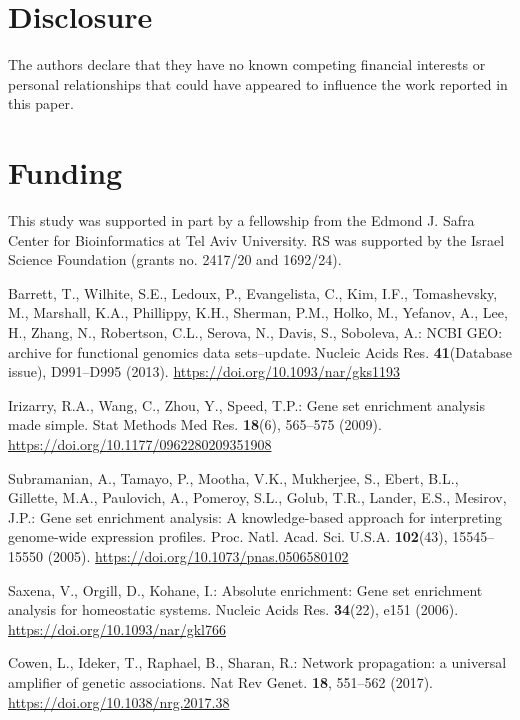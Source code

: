 \documentclass{article}
\begin{document}
\section*{Disclosure}
The authors declare that they have no known competing financial interests or personal relationships that could have appeared to influence the work reported in this paper.

\section*{Funding}
This study was supported in part by a fellowship from the Edmond J. Safra Center for Bioinformatics at Tel Aviv University. 
RS was supported by the Israel Science Foundation (grants no. 2417/20 and 1692/24).

\begin{thebibliography}{spmpsci}

Barrett, T., Wilhite, S.E., Ledoux, P., Evangelista, C., Kim, I.F., Tomashevsky, M., Marshall, K.A., Phillippy, K.H., Sherman, P.M., Holko, M., Yefanov, A., Lee, H., Zhang, N., Robertson, C.L., Serova, N., Davis, S., Soboleva, A.:
NCBI GEO: archive for functional genomics data sets--update.
Nucleic Acids Res. \textbf{41}(Database issue), D991--D995 (2013).
\url{https://doi.org/10.1093/nar/gks1193}

Irizarry, R.A., Wang, C., Zhou, Y., Speed, T.P.:
Gene set enrichment analysis made simple.
Stat Methods Med Res. \textbf{18}(6), 565--575 (2009).
\url{https://doi.org/10.1177/0962280209351908}

Subramanian, A., Tamayo, P., Mootha, V.K., Mukherjee, S., Ebert, B.L., Gillette, M.A., Paulovich, A., Pomeroy, S.L., Golub, T.R., Lander, E.S., Mesirov, J.P.:
Gene set enrichment analysis: A knowledge-based approach for interpreting genome-wide expression profiles.
Proc. Natl. Acad. Sci. U.S.A. \textbf{102}(43), 15545--15550 (2005).
\url{https://doi.org/10.1073/pnas.0506580102}

Saxena, V., Orgill, D., Kohane, I.:
Absolute enrichment: Gene set enrichment analysis for homeostatic systems.
Nucleic Acids Res. \textbf{34}(22), e151 (2006).
\url{https://doi.org/10.1093/nar/gkl766}

Cowen, L., Ideker, T., Raphael, B., Sharan, R.:
Network propagation: a universal amplifier of genetic associations.
Nat Rev Genet. \textbf{18}, 551--562 (2017).
\url{https://doi.org/10.1038/nrg.2017.38}


\end{thebibliography}
\end{document}
